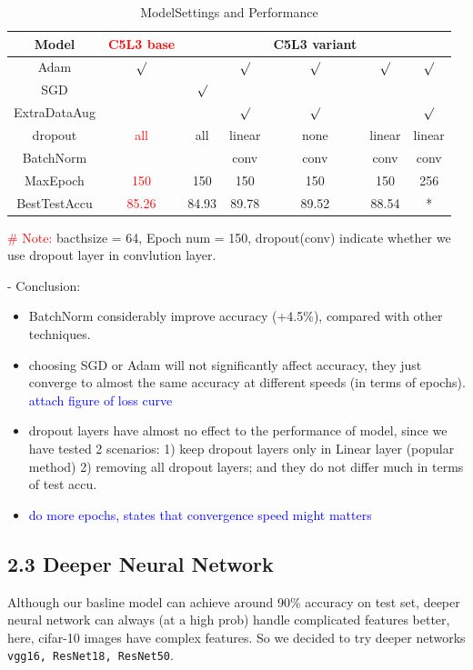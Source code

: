 \documentclass{article}
\newcommand{\subs}[1]{\subsection*{#1}}
\begin{document}
\begin{table}[htbp]
  \centering
  \caption{ModelSettings and Performance}
  \label{tab:model-compare}
  \begin{tabular}{|c|c|ccccc|} 
    \hline
    Model &\textcolor{red}{C5L3 base} &  &  & C5L3 variant & &   \\
    \hline
    Adam &  \textcolor{red}{ $\surd$ }   &  & $\surd$ & $\surd$ & $\surd$  & $\surd$\\ 
    SGD & & $\surd$   & & &  &\\
    ExtraDataAug& &  & $\surd$ &  $\surd$ &  &$\surd$\\
    dropout &\textcolor{red}{all} & all   & linear& none & linear  & linear \\ 
    BatchNorm & & & conv & conv  & conv & conv \\ 
    MaxEpoch & \textcolor{red}{150} & 150 & 150 & 150  & 150 & 256 \\
    \hline
    BestTestAccu & \textcolor{red}{85.26} &84.93 &89.78 & 89.52& 88.54 & * \\
    \hline
  \end{tabular} 
\end{table}


\textcolor{red}{\# Note:} bacthsize = 64, Epoch num = 150, dropout(conv) indicate whether we use dropout layer in convlution layer.

\noindent - Conclusion: 
\begin{itemize}
  \item BatchNorm considerably improve accuracy (+4.5\%), compared with other techniques.
  \item choosing SGD or Adam will not significantly affect accuracy, they just converge to almost the same accuracy at different speeds (in terms of epochs). \textcolor{blue}{attach figure of loss curve}
  \item dropout layers have almost no effect to the performance of model, since we have tested 2 scenarios: 1) keep dropout layers only in Linear layer (popular method) 2) removing all dropout layers; and they do not differ much in terms of test accu.
  \item \textcolor{blue}{do more epochs, states that convergence speed might matters}
\end{itemize}

\subs{2.3 Deeper Neural Network}
Although our basline model can achieve around 90\% accuracy on test set, deeper neural network can always (at a high prob) handle complicated features better, here, cifar-10 images have complex features. So we decided to try deeper networks \texttt{vgg16, ResNet18, ResNet50}.
\end{document}
